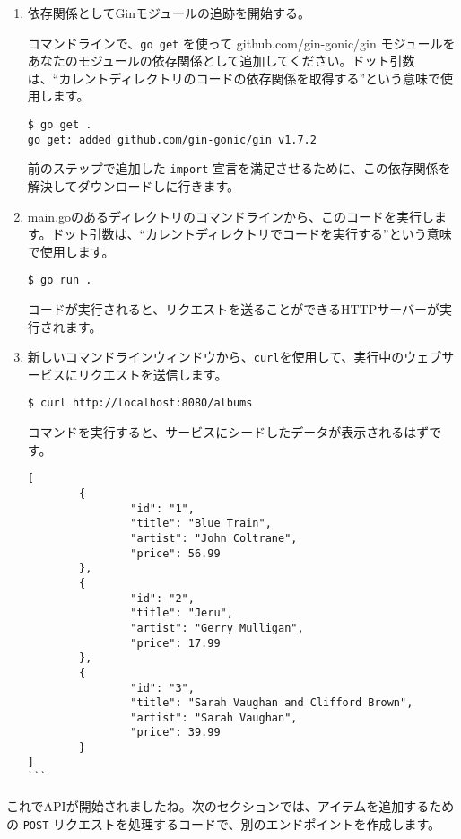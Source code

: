 \begin{enumerate}
\item
  依存関係としてGinモジュールの追跡を開始する。

  コマンドラインで、\texttt{go\ get} を使って github.com/gin-gonic/gin
  モジュールをあなたのモジュールの依存関係として追加してください。ドット引数は、``カレントディレクトリのコードの依存関係を取得する''という意味で使用します。

\begin{lstlisting}[numbers=none]
$ go get .
go get: added github.com/gin-gonic/gin v1.7.2
\end{lstlisting}

  前のステップで追加した \texttt{import}
  宣言を満足させるために、この依存関係を解決してダウンロードしに行きます。
\item
  main.goのあるディレクトリのコマンドラインから、このコードを実行します。ドット引数は、``カレントディレクトリでコードを実行する''という意味で使用します。

\begin{lstlisting}[numbers=none]
$ go run .
\end{lstlisting}

  コードが実行されると、リクエストを送ることができるHTTPサーバーが実行されます。
\item
  新しいコマンドラインウィンドウから、\texttt{curl}を使用して、実行中のウェブサービスにリクエストを送信します。

\begin{lstlisting}[numbers=none]
$ curl http://localhost:8080/albums
\end{lstlisting}

  コマンドを実行すると、サービスにシードしたデータが表示されるはずです。

\begin{lstlisting}[numbers=none]
[
        {
                "id": "1",
                "title": "Blue Train",
                "artist": "John Coltrane",
                "price": 56.99
        },
        {
                "id": "2",
                "title": "Jeru",
                "artist": "Gerry Mulligan",
                "price": 17.99
        },
        {
                "id": "3",
                "title": "Sarah Vaughan and Clifford Brown",
                "artist": "Sarah Vaughan",
                "price": 39.99
        }
]
```
\end{lstlisting}
\end{enumerate}

これでAPIが開始されましたね。次のセクションでは、アイテムを追加するための
\texttt{POST}
リクエストを処理するコードで、別のエンドポイントを作成します。
